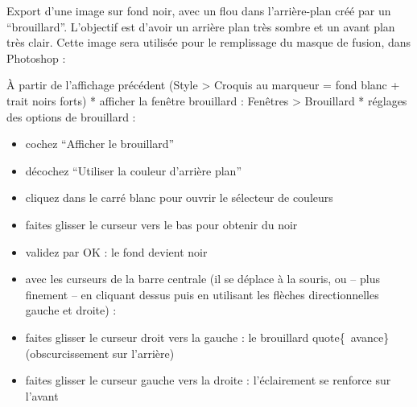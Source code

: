 \documentclass[a4paper,12pt,french]{sphinxmanual}
\begin{document}
Export d'une image sur fond noir, avec un flou dans l'arrière-plan créé par un ``brouillard''. L'objectif est d'avoir un arrière plan très sombre et un avant plan très clair. Cette image sera utilisée pour le remplissage du masque de fusion, dans Photoshop :

À partir de l'affichage précédent (Style \textgreater{} Croquis au marqueur = fond blanc + trait noirs forts)
* afficher la fenêtre brouillard : Fenêtres \textgreater{} Brouillard
* réglages des options de brouillard :
\begin{itemize}
\item {} 
cochez ``Afficher le brouillard''

\item {} 
décochez ``Utiliser la couleur d'arrière plan''

\item {} 
cliquez dans le carré blanc pour ouvrir le sélecteur de couleurs

\item {} 
faites glisser le curseur vers le bas pour obtenir du noir

\item {} 
validez par OK : le fond devient noir

\item {} 
avec les curseurs de la barre centrale (il se déplace à la souris, ou – plus finement – en cliquant dessus puis en utilisant les flèches directionnelles gauche et droite) :

\item {} 
faites glisser le curseur droit vers la gauche : le brouillard quote\{ avance\}(obscurcissement sur l'arrière)

\item {} 
faites glisser le curseur gauche vers la droite : l'éclairement se renforce sur l'avant

\end{itemize}
\end{document}

